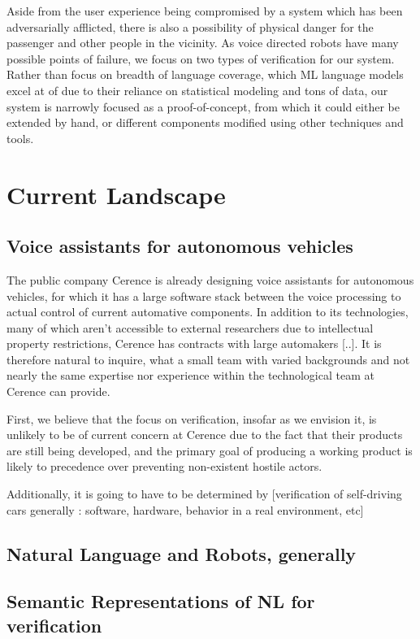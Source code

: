 \documentclass[a4paper, 11pt]{article}
\begin{document}
Aside from the user experience being compromised by a system which has been
adversarially afflicted, there is also a possibility of physical danger for the
passenger and other people in the vicinity. As voice directed robots have many
possible points of failure, we focus on two types of verification for our
system. Rather than focus on breadth of language coverage, which ML language
models excel at of due to their reliance on statistical modeling and tons
of data, our system is narrowly focused as a proof-of-concept, from which it
could either be extended by hand, or different components modified using
other techniques and tools.

\section{Current Landscape} 

\subsection{Voice assistants for autonomous vehicles}

The public company Cerence \cite{} is already designing voice assistants for autonomous
vehicles, for which it has a large software stack between the voice processing
to actual control of current automative components. In addition to its 
technologies, many of which aren't accessible to external researchers due to
intellectual property restrictions, Cerence has contracts with large automakers
[..]. It is therefore natural to inquire, what a small team with varied
backgrounds and not nearly the same expertise nor experience within the
technological team at Cerence can provide.

First, we believe that the focus on verification, insofar as we envision it, is
unlikely to be of current concern at Cerence due to the fact that their products
are still being developed, and the primary goal of producing a working product
is likely to precedence over preventing non-existent hostile actors.

Additionally, it is going to have to be determined by 
[verification of self-driving cars generally : software, hardware, behavior in
a real environment, etc]


\subsection{Natural Language and Robots, generally}

\subsection{Semantic Representations of NL for verification}
\end{document}
